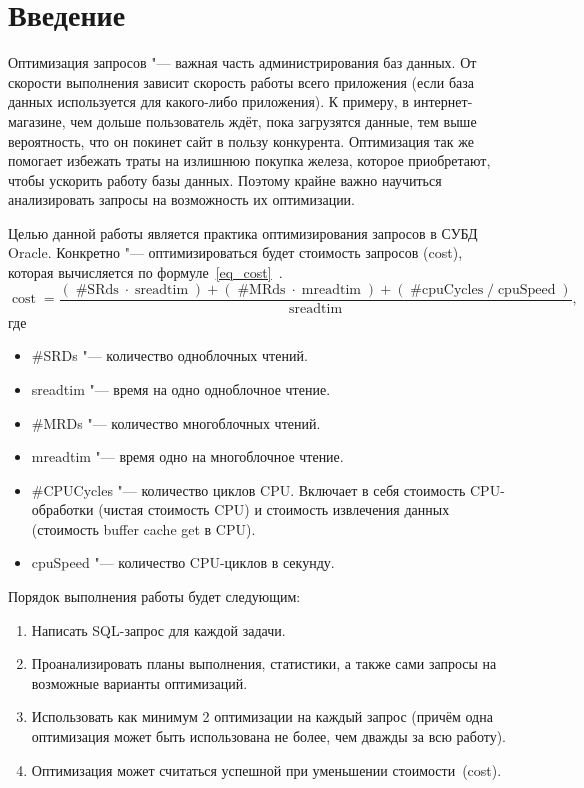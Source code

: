 \chapter*{Введение} %

Оптимизация запросов "--- важная часть администрирования баз данных.
От скорости выполнения зависит скорость работы всего приложения (если база данных используется для какого-либо приложения).
К примеру, в интернет-магазине, чем дольше пользователь ждёт, пока загрузятся данные, тем выше вероятность, что он покинет сайт в пользу конкурента.
Оптимизация так же помогает избежать траты на излишнюю покупка железа, которое приобретают, чтобы ускорить работу базы данных.
Поэтому крайне важно научиться анализировать запросы на возможность их оптимизации.

Целью данной работы является практика оптимизирования запросов в СУБД Oracle.
Конкретно "--- оптимизироваться будет стоимость запросов (cost), которая вычисляется по формуле~\eqref{eq_cost}~\cite{ExplainPlan}.
\begin{equation}\label{eq_cost}%
  \operatorname{cost} = \frac{
    (\operatorname{\#SRds} \cdot \operatorname{sreadtim})
      + (\operatorname{\#MRds} \cdot \operatorname{mreadtim})
      + (\operatorname{\#cpuCycles} / \operatorname{cpuSpeed})
  }{
    \operatorname{sreadtim}
  },
\end{equation}
где
\begin{itemize}%
  \item #SRDs "--- количество одноблочных чтений.
  \item sreadtim "--- время на одно одноблочное чтение.
  \item #MRDs "--- количество многоблочных чтений.
  \item mreadtim "--- время одно на многоблочное чтение.
  \item \#CPUCycles "--- количество циклов CPU. Включает в себя стоимость CPU-обработки (чистая стоимость CPU) и стоимость извлечения данных (стоимость buffer cache get в CPU).
  \item cpuSpeed "--- количество CPU-циклов в секунду.
\end{itemize}

Порядок выполнения работы будет следующим:
\begin{enumerate}[1.]%
  \item Написать SQL-запрос для каждой задачи.
  \item Проанализировать планы выполнения, статистики, а также сами запросы на возможные варианты оптимизаций.
  \item Использовать как минимум 2 оптимизации на каждый запрос (причём одна оптимизация может быть использована не более, чем дважды за всю работу).
  \item Оптимизация может считаться успешной при уменьшении стоимости~(cost).
\end{enumerate}
